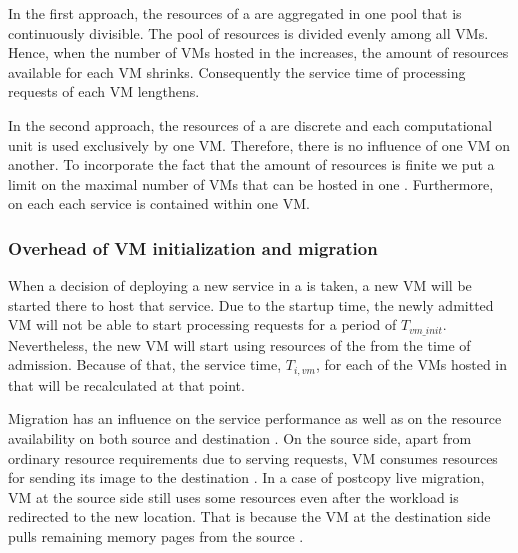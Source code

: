 In the first approach, the resources of a \dc{} are aggregated in one pool that is continuously divisible.
The pool of resources is divided evenly among all VMs.
Hence, when the number of VMs hosted in the \dc{} increases, the amount of resources available for each VM shrinks.
Consequently the service time of processing requests of each VM lengthens.

In the second approach, the resources of a \dc{} are discrete and each computational unit is used exclusively by one VM.
Therefore, there is no influence of one VM on another.
To incorporate the fact that the amount of resources is finite we put a limit on the maximal number of VMs that can be hosted in one \dc{}.
Furthermore, on each \dc each service is contained within one VM. 

\subsubsection{Overhead of VM initialization and migration}
When a decision of deploying a new service in a \dc{} is taken, a new VM will be started there to host that service.
Due to the startup time, the newly admitted VM will not be able to start processing requests for a period of $T_{vm\_init}$. 
Nevertheless, the new VM will start using resources of the \dc{} from the time of admission.
Because of that, the service time, $T_{i,vm}$, for each of the VMs hosted in that \dc{} will be recalculated at that point.

Migration has an influence on the service performance as well as on the resource availability on both source and destination \dc{}.
On the source side, apart from ordinary resource requirements due to serving requests, VM consumes resources for sending its image to the destination \dc{}.
In a case of postcopy live migration, VM at the source side still uses some resources even after the workload is redirected to the new location.
That is because the VM at the destination side pulls remaining memory pages from the source \dc{}.

